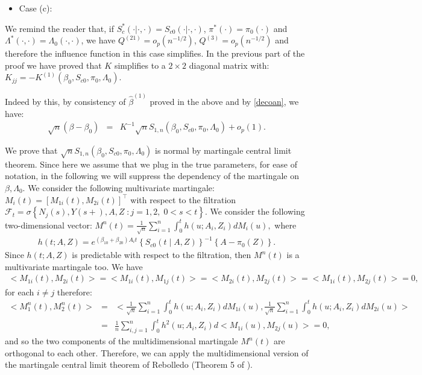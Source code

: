 \documentclass[11pt]{article}
\newcommand{\ee}{\end{eqnarray}}
\newcommand{\eqnn}{\begin{eqnarray*}}
\newcommand{\een}{\end{eqnarray*}}
\newcommand{\be}{\begin{eqnarray}}
\begin{document}
\begin{itemize}
\item{Case (c):}
\end{itemize}
We remind the reader that, if $S_c^{*}(\cdot | \cdot,\cdot)=S_{c0}(\cdot | \cdot,\cdot)$, $\pi^{*}(\cdot)=\pi_{0}(\cdot)$ and $\Lambda^{*}(\cdot,\cdot)=\Lambda_{0}(\cdot,\cdot)$, we have ${Q}^{(21)}=o_p(n^{-1/2})$, ${Q}^{(3)}=o_p(n^{-1/2})$ and therefore the influence function in this case simplifies.
In the previous part of the proof we have proved that ${K}$ simplifies to a $2\times2$ diagonal matrix with:
$
{K}_{jj}=-K^{(1)}(\beta_0,S_{c0},\pi_0, \Lambda_{0})$.


Indeed by this, by consistency of $\hat \beta^{(1)}$ proved in the above  and by \eqref{decoan}, we have:
\be\label{anpswnc}
\sqrt{n}({\beta}-{\beta}_0)&=&{K}^{-1}\sqrt{n}{S}_{1,n}(\beta_0, S_{c0},  \pi_0,  \Lambda_{0})+o_p(1).\nonumber
\ee

We prove that $\sqrt{n}{S}_{1,n}(\beta_0, S_{c0},  \pi_0,  \Lambda_{0})$ is normal by martingale central limit theorem.
Since here we assume that we plug in the true parameters, for ease of notation, in the following we will suppress the dependency of the martingale on $\beta,\Lambda_{0}$. 
We consider the following multivariate martingale: 
${M}_i(t)=[M_{1i}(t), M_{2i}(t)]^\top$
with respect to the filtration $\mathcal{F}_t=\sigma\left\{N_{j}(s), Y(s+), A, Z\;:j=1,2,\;0<s<t\right\}$.
We consider the following two-dimensional vector:
$
{M}^n(t)=\frac{1}{\sqrt{n}} \sum_{i=1}^n\int_0^t h(u; A_i,Z_i) d{M}_i(u),
$
where 
\eqnn h(t; A,Z)= e^{ (\beta_{10}  + \beta_{20}) A_i t}\left\{S_{c0}(t \mid A,Z)\right\}^{-1}\left\{A -\pi_0( Z)\right\}.\een
Since $h(t; A,Z)$ is predictable with respect to the filtration, then ${M}^n(t)$ is a multivariate martingale too.
We have \eqnn<M_{1i}(t),M_{2i}(t)>=<M_{1i}(t),M_{1j}(t)>=<M_{2i}(t),M_{2j}(t)>=<M_{1i}(t),M_{2j}(t)>=0,\een for each $i\neq j$ therefore:
\eqnn
<{M}_1^n(t),{M}_2^n(t)>&=&<\frac{1}{\sqrt{n}} \sum_{i=1}^n\int_0^t h(u; A_i,Z_i) d{M}_{1i}(u),\frac{1}{\sqrt{n}} \sum_{i=1}^n\int_0^t h(u; A_i,Z_i) d{M}_{2i}(u)>\\&=&\frac{1}{n} \sum_{i,j=1}^n\int_0^t h^2(u; A_i,Z_i) d<M_{1i}(u),M_{2j}(u)>=0,
\een
and so the two components of the multidimensional martingale ${M}^n(t)$ are orthogonal to each other.
Therefore, we can apply the multidimensional version of the martingale central limit theorem of Rebolledo (Theorem 5 of \cite{rebolledo1978applications}). 
\end{document}
